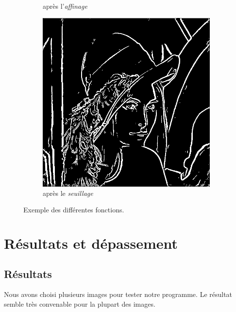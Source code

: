 \documentclass[hidelinks,11pt]{article}
\theoremstyle{mytheoremstyle}
\theoremstyle{mytheoremstyle}
\theoremstyle{myproblemstyle}
\begin{document}
\begin{figure}
\begin{subfigure}[b]{0.3\textwidth}
        \caption{après l'\textit{affinage}}
    \end{subfigure}
    \hfill
    \begin{subfigure}[b]{0.3\textwidth}
        \centering
        \includegraphics[width=\textwidth]{figs/fig7c}
        \caption{après le \textit{seuillage}}
    \end{subfigure}
       \caption{Exemple des différentes fonctions.}
\end{figure}



    \section{Résultats et dépassement}
    \subsection{Résultats}
    Nous avons choisi plusieurs images pour tester notre programme. Le résultat semble très convenable pour la plupart des images.
\end{document}
